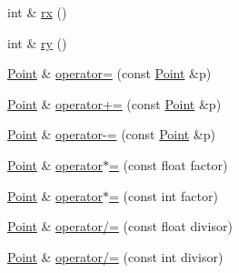 \begin{DoxyCompactItemize}
\item 
int \& \hyperlink{classprism_1_1_point_a66bb6ecfd68e0362f7e32252a7b1d1ab}{rx} ()
\item 
int \& \hyperlink{classprism_1_1_point_a2fe1da7d2ba117441bccd62bbf5b25b4}{ry} ()
\item 
\hyperlink{classprism_1_1_point}{Point} \& \hyperlink{classprism_1_1_point_a6d99f99a4172e0cbb540bb018a9be9ba}{operator=} (const \hyperlink{classprism_1_1_point}{Point} \&p)
\item 
\hyperlink{classprism_1_1_point}{Point} \& \hyperlink{classprism_1_1_point_ab6334cec47f3013704794116790ddbce}{operator+=} (const \hyperlink{classprism_1_1_point}{Point} \&p)
\item 
\hyperlink{classprism_1_1_point}{Point} \& \hyperlink{classprism_1_1_point_a95c85d6e13126f0d4099479a5c0cfcce}{operator-\/=} (const \hyperlink{classprism_1_1_point}{Point} \&p)
\item 
\hyperlink{classprism_1_1_point}{Point} \& \hyperlink{classprism_1_1_point_adae6e09469372adf18102d06630cb5c0}{operator$\ast$=} (const float factor)
\item 
\hyperlink{classprism_1_1_point}{Point} \& \hyperlink{classprism_1_1_point_a462c47b75debd2028ceb47f039ef5220}{operator$\ast$=} (const int factor)
\item 
\hyperlink{classprism_1_1_point}{Point} \& \hyperlink{classprism_1_1_point_a1475d1de232dc6cc8ba1aaa726e1ed60}{operator/=} (const float divisor)
\item 
\hyperlink{classprism_1_1_point}{Point} \& \hyperlink{classprism_1_1_point_a83e10bb0243c4539f79dc701383d6cfd}{operator/=} (const int divisor)
\end{DoxyCompactItemize}
